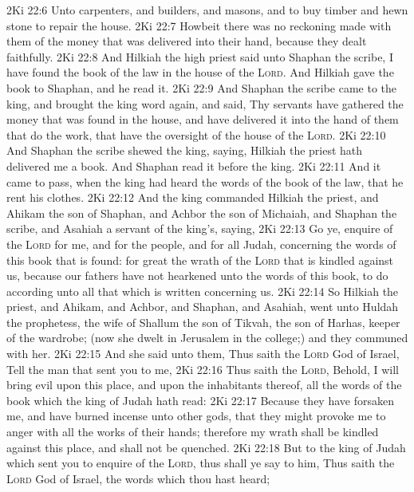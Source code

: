 \vs 2Ki 22:6 Unto carpenters, and builders, and masons, and to buy timber and hewn stone to repair the house.
\vs 2Ki 22:7 Howbeit there was no reckoning made with them of the money that was delivered into their hand, because they dealt faithfully.
\vs 2Ki 22:8 And Hilkiah the high priest said unto Shaphan the scribe, I have found the book of the law in the house of the \textsc{Lord}. And Hilkiah gave the book to Shaphan, and he read it.
\vs 2Ki 22:9 And Shaphan the scribe came to the king, and brought the king word again, and said, Thy servants have gathered the money that was found in the house, and have delivered it into the hand of them that do the work, that have the oversight of the house of the \textsc{Lord}.
\vs 2Ki 22:10 And Shaphan the scribe shewed the king, saying, Hilkiah the priest hath delivered me a book. And Shaphan read it before the king.
\vs 2Ki 22:11 And it came to pass, when the king had heard the words of the book of the law, that he rent his clothes.
\vs 2Ki 22:12 And the king commanded Hilkiah the priest, and Ahikam the son of Shaphan, and Achbor the son of Michaiah, and Shaphan the scribe, and Asahiah a servant of the king's, saying,
\vs 2Ki 22:13 Go ye, enquire of the \textsc{Lord} for me, and for the people, and for all Judah, concerning the words of this book that is found: for great  the wrath of the \textsc{Lord} that is kindled against us, because our fathers have not hearkened unto the words of this book, to do according unto all that which is written concerning us.
\vs 2Ki 22:14 So Hilkiah the priest, and Ahikam, and Achbor, and Shaphan, and Asahiah, went unto Huldah the prophetess, the wife of Shallum the son of Tikvah, the son of Harhas, keeper of the wardrobe; (now she dwelt in Jerusalem in the college;) and they communed with her.
\vs 2Ki 22:15 And she said unto them, Thus saith the \textsc{Lord} God of Israel, Tell the man that sent you to me,
\vs 2Ki 22:16 Thus saith the \textsc{Lord}, Behold, I will bring evil upon this place, and upon the inhabitants thereof,  all the words of the book which the king of Judah hath read:
\vs 2Ki 22:17 Because they have forsaken me, and have burned incense unto other gods, that they might provoke me to anger with all the works of their hands; therefore my wrath shall be kindled against this place, and shall not be quenched.
\vs 2Ki 22:18 But to the king of Judah which sent you to enquire of the \textsc{Lord}, thus shall ye say to him, Thus saith the \textsc{Lord} God of Israel,  the words which thou hast heard;
